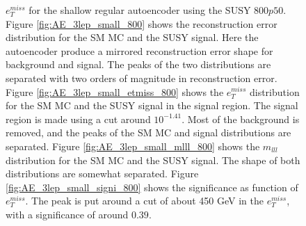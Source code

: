 \begin{figure}[H]
{    $e_T^{miss}$ for the shallow regular autoencoder using the SUSY $800p50$. 
    Figure \ref{fig:AE_3lep_small_800} shows the reconstruction error 
    distribution for the SM MC and the SUSY signal. Here the autoencoder produce a mirrored reconstruction error shape for background and 
    signal. The peaks of the two distributions are separated with two orders of magnitude in reconstruction error. Figure \ref{fig:AE_3lep_small_etmiss_800} 
    shows the $e_T^{miss}$ distribution for the SM MC and the SUSY signal in the signal region. 
    The signal region is made using a cut around $10^{-1.41}$. Most of the background is removed, and the peaks of the SM MC and signal 
    distributions are separated. Figure \ref{fig:AE_3lep_small_mlll_800} shows the $m_{lll}$ distribution for the SM MC and the SUSY signal. 
    The shape of both distributions are somewhat separated. Figure \ref{fig:AE_3lep_small_signi_800} shows the significance as function of
    $e_T^{miss}$. The peak is put around a cut of about 450 GeV in the $e_T^{miss}$, with a significance of around $0.39$.}
    \label{fig:AE_3lep_small_rec_sig_signi_800}
\end{figure}

